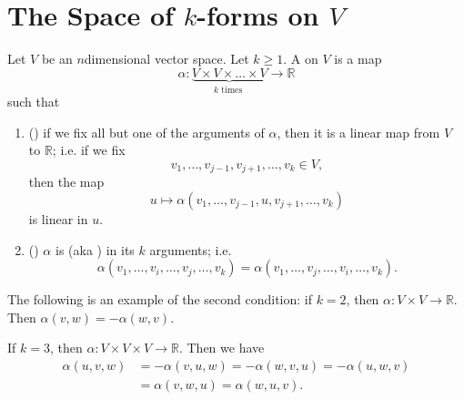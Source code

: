 \documentclass[notoc,notitlepage]{tufte-book}
\begin{document}


\section{The Space of \texorpdfstring{$k$}{k}-forms on \texorpdfstring{$V$}{V}}%
\label{sec:the_space_of_k_forms_on_v_}

\begin{defn}[$k$-Form]\label{defn:_k_form}
  Let $V$ be an $n$dimensional vector space. Let $k \geq 1$. A  on
  $V$ is a map
  \begin{equation*}
    \alpha : \underbrace{V \times V \times \hdots \times V}_{k \text{ times }} \to \mathbb{R}
  \end{equation*}
  such that
  \begin{enumerate}
    \item () if we fix all but one of
      the arguments of $\alpha$, then it is a linear map
      from $V$ to $\mathbb{R}$; i.e. if we fix
      \begin{equation*}
        v_1, \ldots, v_{j - 1}, v_{j + 1}, \ldots, v_k \in V,
      \end{equation*}
      then the map
      \begin{equation*}
        u \mapsto \alpha(v_1, \ldots, v_{j - 1}, u, v_{j + 1}, \ldots, v_k)
      \end{equation*}
       is linear in $u$.

    \item () $\alpha$ is 
      (aka ) in its $k$ arguments; i.e.
      \begin{equation*}
        \alpha ( v_1, \ldots, v_i, \ldots, v_j, \ldots, v_k )
          = \alpha ( v_1, \ldots, v_j, \ldots, v_i, \ldots, v_k ).
      \end{equation*}
  \end{enumerate}
\end{defn}

\begin{eg}
  The following is an example of the second condition: if $k = 2$, then
  $\alpha : V \times V \to \mathbb{R}$. Then $\alpha(v, w) = - \alpha(w, v)$.

  If $k = 3$, then $\alpha : V \times V \times V \to \mathbb{R}$. Then we
  have
  \begin{align*}
    \alpha(u, v, w) &= - \alpha(v, u, w) = - \alpha(w, v, u) = - \alpha(u, w, v) \\
                    &= \alpha(v, w, u) = \alpha(w, u, v).
  \end{align*}
\end{eg}
\end{document}
